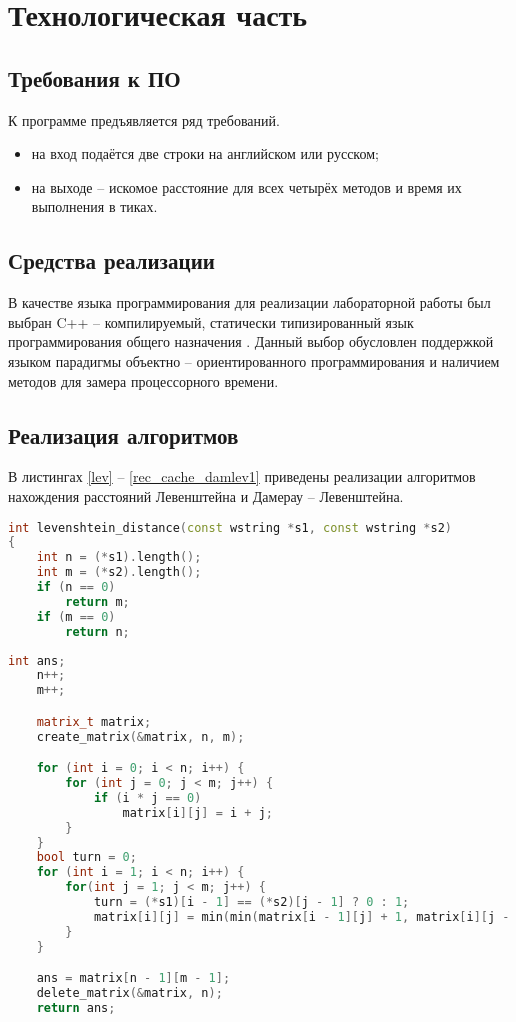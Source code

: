 \chapter{Технологическая часть}

\section{Требования к ПО}

К программе предъявляется ряд требований.
\begin{itemize}
	\item на вход подаётся две строки на английском или русском;
	\item на выходе -- искомое расстояние для всех четырёх методов и время их выполнения в тиках.
\end{itemize}

\section{Средства реализации}

В качестве языка программирования для реализации лабораторной работы был выбран C++ – компилируемый, статически типизированный язык
программирования общего назначения \cite{cpp}.
Данный выбор обусловлен поддержкой языком парадигмы объектно --
ориентированного программирования и наличием методов для замера процессорного времени.

\section{Реализация алгоритмов}

В листингах \ref{lev} -- \ref{rec_cache_damlev1} приведены реализации алгоритмов нахождения расстояний Левенштейна и Дамерау -- Левенштейна.

\begin{lstlisting}[label=lev,caption=Реализация нерекурсивного алгоритма поиска расстояния Левенштейна (начало), language=C++]
int levenshtein_distance(const wstring *s1, const wstring *s2)
{
    int n = (*s1).length();
    int m = (*s2).length();
    if (n == 0)
        return m;
    if (m == 0)
        return n;
\end{lstlisting}

\begin{lstlisting}[label=lev1,caption=Реализация нерекурсивного алгоритма поиска расстояния Левенштейна (конец), language=C++, firstnumber=last]
    int ans;
    n++;
    m++;

    matrix_t matrix;
    create_matrix(&matrix, n, m);

    for (int i = 0; i < n; i++) {
        for (int j = 0; j < m; j++) {
            if (i * j == 0)
                matrix[i][j] = i + j;
        }
    }
    bool turn = 0;
    for (int i = 1; i < n; i++) {
        for(int j = 1; j < m; j++) {
            turn = (*s1)[i - 1] == (*s2)[j - 1] ? 0 : 1;
            matrix[i][j] = min(min(matrix[i - 1][j] + 1, matrix[i][j - 1] + 1), matrix[i - 1][j - 1] + turn);
        }
    }

    ans = matrix[n - 1][m - 1];
    delete_matrix(&matrix, n);
    return ans;
\end{lstlisting}

